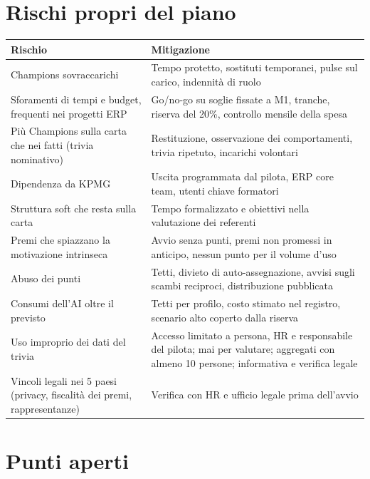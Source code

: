 \documentclass[11pt,a4paper]{article}
\begin{document}
\section{Rischi propri del piano}\label{sec:18}

{\small\renewcommand{\arraystretch}{1.25}
\begin{xltabular}{\linewidth}{@{}>{\raggedright\arraybackslash{}\hsize\hspace{0pt}}X>{\raggedright\arraybackslash{}\hsize\hspace{0pt}}X@{}}
\toprule
\textbf{Rischio} & \textbf{Mitigazione} \\
\midrule
\endhead
Champions sovraccarichi & Tempo protetto, sostituti temporanei, pulse sul carico, indennità di ruolo \\
Sforamenti di tempi e budget, frequenti nei progetti ERP & Go/no-go su soglie fissate a M1, tranche, riserva del 20\%, controllo mensile della spesa \\
Più Champions sulla carta che nei fatti (trivia nominativo) & Restituzione, osservazione dei comportamenti, trivia ripetuto, incarichi volontari \\
Dipendenza da KPMG & Uscita programmata dal pilota, ERP core team, utenti chiave formatori \\
Struttura soft che resta sulla carta & Tempo formalizzato e obiettivi nella valutazione dei referenti \\
Premi che spiazzano la motivazione intrinseca & Avvio senza punti, premi non promessi in anticipo, nessun punto per il volume d'uso \\
Abuso dei punti & Tetti, divieto di auto-assegnazione, avvisi sugli scambi reciproci, distribuzione pubblicata \\
Consumi dell'AI oltre il previsto & Tetti per profilo, costo stimato nel registro, scenario alto coperto dalla riserva \\
Uso improprio dei dati del trivia & Accesso limitato a persona, HR e responsabile del pilota; mai per valutare; aggregati con almeno 10 persone; informativa e verifica legale \\
Vincoli legali nei 5 paesi (privacy, fiscalità dei premi, rappresentanze) & Verifica con HR e ufficio legale prima dell'avvio \\
\bottomrule
\end{xltabular}}

\section{Punti aperti}\label{sec:19}
\end{document}
